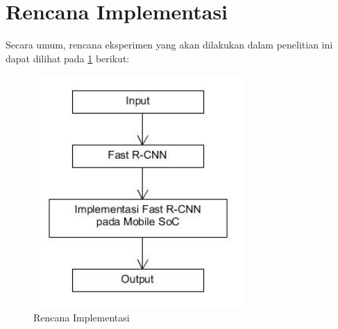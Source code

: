 \section{Rencana Implementasi}
Secara umum, rencana eksperimen yang akan dilakukan dalam penelitian ini dapat dilihat pada \ref{fig:rencana_implementasi} berikut:
\begin{figure}[htp]
	\centering
	\includegraphics[width=8cm]{pics/rencana_implementasi}
	\caption{Rencana Implementasi}
	\label{fig:rencana_implementasi}
\end{figure}

